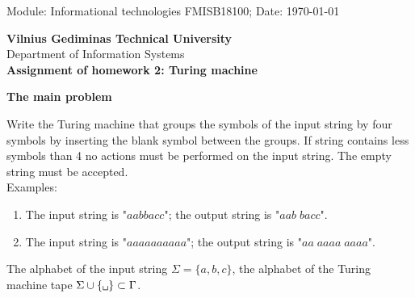 \documentclass[12pt, a4paper]{report}
\newcommand{\vs}{\vskip .1in}
\newcommand{\vsp}{\vspace{-0.25cm}}
\begin{document}
\pagestyle{headings}







Module: Informational technologies FMISB18100; Date: \today{}
\vspace{-.10cm}
\begin{center}{\bf Vilnius Gediminas Technical University}\\
	Department of Information Systems\\
	
	\large{\bf Assignment of homework 2: Turing machine} 
	
\end{center}
\vsp


{\bf The main problem}
\vsp
\begin{framed}
	Write the Turing machine that groups the symbols of the input string by four symbols
by inserting the blank symbol between the groups. If string contains less symbols than 4
no actions must be performed on the input string. The empty string must be accepted.\\
	Examples:
	\begin{enumerate}
		\item The input string is "$ aabbacc $"; the output string is "$ aab \; bacc $".
		\item The input string is "$ aaaaaaaaaa $"; the output string is "$ aa \; aaaa \; aaaa $".
	\end{enumerate}
	The alphabet of the input string $\Sigma = \{a, b, c\}$, the alphabet of the Turing machine tape $ \Sigma \cup \{\texttt{\char32}\} \subset \Gamma $.
\end{framed}
\end{document}
